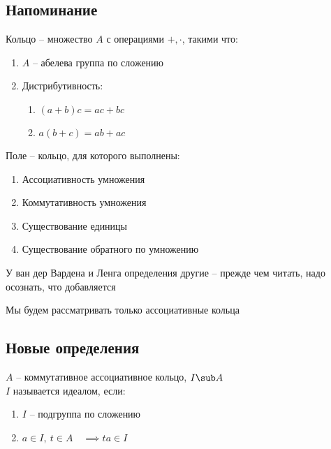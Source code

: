 \subsection{Напоминание}

\begin{definition}
	Кольцо -- множество $ A $ с операциями $ +, \cdot $, такими что:
	\begin{enumerate}
		\item $ A $ -- абелева группа по сложению
		\item Дистрибутивность:
		\begin{enumerate}
			\item $ (a + b)c = ac + bc $
			\item $ a(b + c) = ab + ac $
		\end{enumerate}
	\end{enumerate}
\end{definition}

\begin{definition}
	Поле -- кольцо, для которого выполнены:
	\begin{enumerate}
		\item Ассоциативность умножения
		\item Коммутативность умножения
		\item Существование единицы
		\item Существование обратного по умножению
	\end{enumerate}
\end{definition}

\begin{note}
	У ван дер Вардена и Ленга определения другие -- прежде чем читать, надо осознать, что добавляется
\end{note}

\begin{definition}
	Мы будем рассматривать только ассоциативные кольца
\end{definition}

\subsection{Новые определения}

\begin{definition}
	$ A $ -- коммутативное ассоциативное кольцо, $ I \sub A $ \\
	$ I $ называется идеалом, если:
	\begin{enumerate}
		\item $ I $ -- подгруппа по сложению
		\item $ a \in I, ~ t \in A \quad \implies ta \in I $
	\end{enumerate}
\end{definition}

